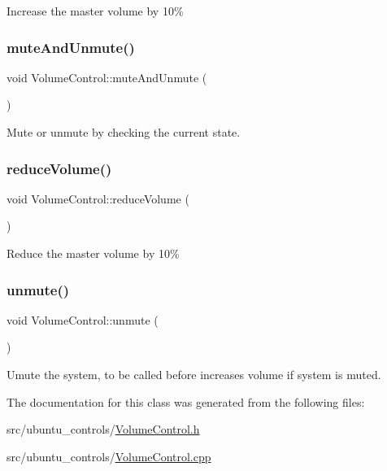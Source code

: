 Increase the master volume by 10\% \mbox{\label{classUbuntuController_1_1VolumeControl_a77273bc06d0f25068045860b0c6b4f91}} 
\subsubsection{\texorpdfstring{mute\+And\+Unmute()}{muteAndUnmute()}}
{\footnotesize\ttfamily void Volume\+Control\+::mute\+And\+Unmute (\begin{DoxyParamCaption}{ }\end{DoxyParamCaption})}

Mute or unmute by checking the current state. \mbox{\label{classUbuntuController_1_1VolumeControl_ad8e3e3740268388e906984fa807761a1}} 
\subsubsection{\texorpdfstring{reduce\+Volume()}{reduceVolume()}}
{\footnotesize\ttfamily void Volume\+Control\+::reduce\+Volume (\begin{DoxyParamCaption}{ }\end{DoxyParamCaption})}

Reduce the master volume by 10\% \mbox{\label{classUbuntuController_1_1VolumeControl_a4a541c510e22cd07b206ca80f979c1a1}} 
\subsubsection{\texorpdfstring{unmute()}{unmute()}}
{\footnotesize\ttfamily void Volume\+Control\+::unmute (\begin{DoxyParamCaption}{ }\end{DoxyParamCaption})}

Umute the system, to be called before increases volume if system is muted. 

The documentation for this class was generated from the following files\+:\begin{DoxyCompactItemize}
\item 
src/ubuntu\+\_\+controls/\hyperlink{VolumeControl_8h}{Volume\+Control.\+h}\item 
src/ubuntu\+\_\+controls/\hyperlink{VolumeControl_8cpp}{Volume\+Control.\+cpp}\end{DoxyCompactItemize}
